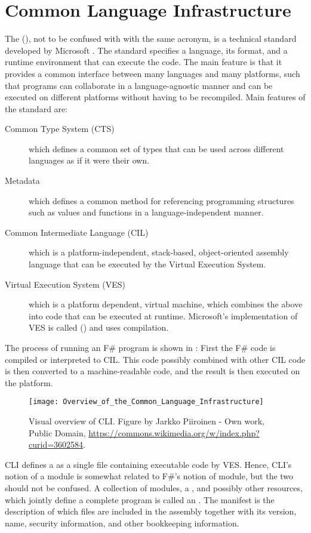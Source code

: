 \chapter{Common Language Infrastructure}
\label{chap:cli} 
The  (), not to be confused with  with the same acronym, is a technical standard developed by Microsoft \cite{iso23271:2012, ecma335}. The standard specifies a language, its format, and a runtime environment that can execute the code. The main feature is that it provides a common interface between many languages and many platforms, such that programs can collaborate in a language-agnostic manner and can be executed on different platforms without having to be recompiled. Main features of the standard are:
\begin{description}
\item[Common Type System (CTS)] which defines a common set of types that can be used across different languages as if it were their own.
\item[Metadata] which defines a common method for referencing programming structures such as values and functions in a language-independent manner.
\item[Common Intermediate Language (CIL)] which is a platform-independent, stack-based, object-oriented assembly language that can be executed by the Virtual Execution System.
\item[Virtual Execution System (VES)] which is a platform dependent, virtual machine, which combines the above into code that can be executed at runtime. Microsoft's implementation of VES is called  () and uses  compilation.
\end{description}
The process of running an F\# program is shown in : First the F\# code is compiled or interpreted to CIL. This code possibly combined with other CIL code is then converted to a machine-readable code, and the result is then executed on the platform.
\begin{figure}
  \centering
  \texttt{[image: Overview\_of\_the\_Common\_Language\_Infrastructure]}
  \caption{Visual overview of CLI. Figure by Jarkko Piiroinen - Own work, Public Domain, \url{https://commons.wikimedia.org/w/index.php?curid=3602584}.}
  \label{fig:cliOverview}
\end{figure}

CLI defines a  as a single file containing executable code by VES. Hence, CLI's notion of a module is somewhat related to F\#'s notion of module, but the two should not be confused. A collection of modules, a , and possibly other resources, which jointly define a complete program is called an . The manifest is the description of which files are included in the assembly together with its version, name, security information, and other bookkeeping information.


